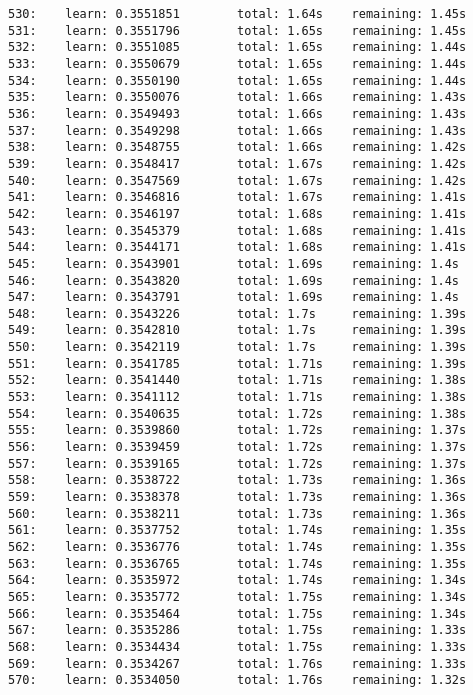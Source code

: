 \documentclass[11pt]{article}
\begin{document}
\begin{Verbatim}[commandchars=\\\{\}]
530:    learn: 0.3551851        total: 1.64s    remaining: 1.45s
531:    learn: 0.3551796        total: 1.65s    remaining: 1.45s
532:    learn: 0.3551085        total: 1.65s    remaining: 1.44s
533:    learn: 0.3550679        total: 1.65s    remaining: 1.44s
534:    learn: 0.3550190        total: 1.65s    remaining: 1.44s
535:    learn: 0.3550076        total: 1.66s    remaining: 1.43s
536:    learn: 0.3549493        total: 1.66s    remaining: 1.43s
537:    learn: 0.3549298        total: 1.66s    remaining: 1.43s
538:    learn: 0.3548755        total: 1.66s    remaining: 1.42s
539:    learn: 0.3548417        total: 1.67s    remaining: 1.42s
540:    learn: 0.3547569        total: 1.67s    remaining: 1.42s
541:    learn: 0.3546816        total: 1.67s    remaining: 1.41s
542:    learn: 0.3546197        total: 1.68s    remaining: 1.41s
543:    learn: 0.3545379        total: 1.68s    remaining: 1.41s
544:    learn: 0.3544171        total: 1.68s    remaining: 1.41s
545:    learn: 0.3543901        total: 1.69s    remaining: 1.4s
546:    learn: 0.3543820        total: 1.69s    remaining: 1.4s
547:    learn: 0.3543791        total: 1.69s    remaining: 1.4s
548:    learn: 0.3543226        total: 1.7s     remaining: 1.39s
549:    learn: 0.3542810        total: 1.7s     remaining: 1.39s
550:    learn: 0.3542119        total: 1.7s     remaining: 1.39s
551:    learn: 0.3541785        total: 1.71s    remaining: 1.39s
552:    learn: 0.3541440        total: 1.71s    remaining: 1.38s
553:    learn: 0.3541112        total: 1.71s    remaining: 1.38s
554:    learn: 0.3540635        total: 1.72s    remaining: 1.38s
555:    learn: 0.3539860        total: 1.72s    remaining: 1.37s
556:    learn: 0.3539459        total: 1.72s    remaining: 1.37s
557:    learn: 0.3539165        total: 1.72s    remaining: 1.37s
558:    learn: 0.3538722        total: 1.73s    remaining: 1.36s
559:    learn: 0.3538378        total: 1.73s    remaining: 1.36s
560:    learn: 0.3538211        total: 1.73s    remaining: 1.36s
561:    learn: 0.3537752        total: 1.74s    remaining: 1.35s
562:    learn: 0.3536776        total: 1.74s    remaining: 1.35s
563:    learn: 0.3536765        total: 1.74s    remaining: 1.35s
564:    learn: 0.3535972        total: 1.74s    remaining: 1.34s
565:    learn: 0.3535772        total: 1.75s    remaining: 1.34s
566:    learn: 0.3535464        total: 1.75s    remaining: 1.34s
567:    learn: 0.3535286        total: 1.75s    remaining: 1.33s
568:    learn: 0.3534434        total: 1.75s    remaining: 1.33s
569:    learn: 0.3534267        total: 1.76s    remaining: 1.33s
570:    learn: 0.3534050        total: 1.76s    remaining: 1.32s

\end{Verbatim}
\end{document}
